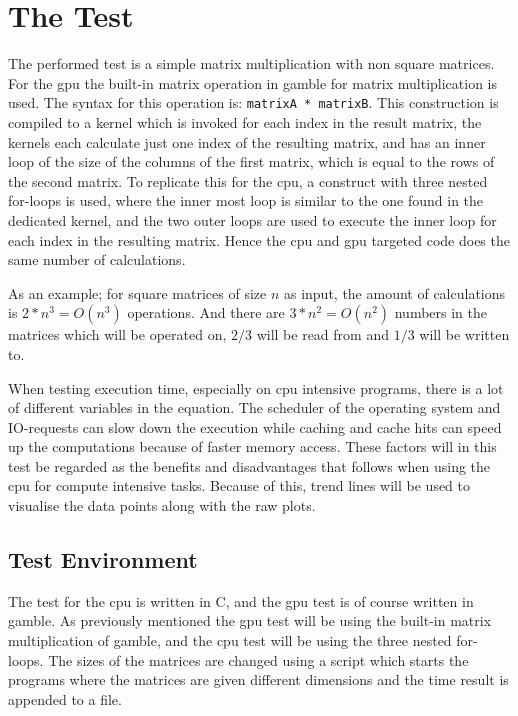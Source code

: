 \section{The Test} %
\label{sec:the_test}
The performed test is a simple matrix multiplication with non square matrices.
For the \acrshort{gpu} the built-in matrix operation in \gls{gamble} for matrix multiplication is used. 
The syntax for this operation is: \texttt{matrixA * matrixB}. 
This construction is compiled to a kernel which is invoked for each index in the result matrix, the kernels each calculate just one index of the resulting matrix, and has an inner loop of the size of the columns of the first matrix, which is equal to the rows of the second matrix.
To replicate this for the \acrshort{cpu}, a construct with three nested for-loops is used, where the inner most loop is similar to the one found in the dedicated kernel, and the two outer loops are used to execute the inner loop for each index in the resulting matrix.
Hence the \acrshort{cpu} and \acrshort{gpu} targeted code does the same number of calculations.
 
As an example; for square matrices of size $n$ as input, the amount of calculations is $2*n^3 = O(n^3)$ operations. 
And there are $3*n^2 = O(n^2)$ numbers in the matrices which will be operated on, $2/3$ will be read from and $1/3$ will be written to.

When testing execution time, especially on \acrshort{cpu} intensive programs, there is a lot of different variables in the equation. 
The scheduler of the operating system and IO-requests can slow down the execution while caching and cache hits can speed up the computations because of faster memory access. 
These factors will in this test be regarded as the benefits and disadvantages that follows when using the \acrshort{cpu} for compute intensive tasks.
Because of this, trend lines will be used to visualise the data points along with the raw plots.

\subsection{Test Environment} %
\label{sub:test_environment}
The test for the \acrshort{cpu} is written in C, and the \acrshort{gpu} test is of course written in \gls{gamble}.
As previously mentioned the \acrshort{gpu} test will be using the built-in matrix multiplication of \gls{gamble}, and the \acrshort{cpu} test will be using the three nested for-loops.
The sizes of the matrices are changed using a script which starts the programs where the matrices are given different dimensions and the time result is appended to a file.

